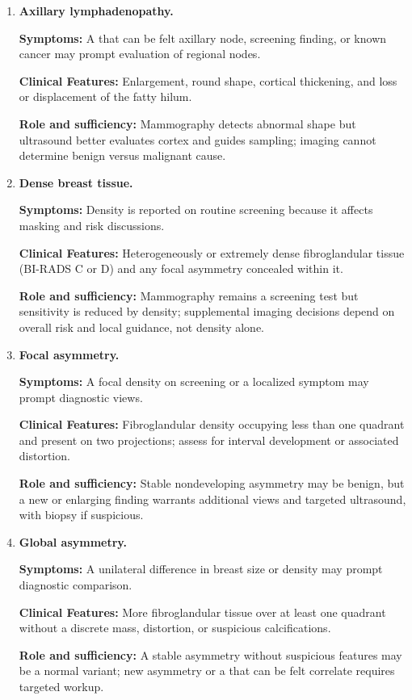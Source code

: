 \begin{enumerate}[leftmargin=*,itemsep=0.45em,topsep=0.4em]
\item \textbf{Axillary lymphadenopathy.}\par\noindent\textbf{Symptoms:} A that can be felt axillary node, screening finding, or known cancer may prompt evaluation of regional nodes.\par\noindent\textbf{Clinical Features:} Enlargement, round shape, cortical thickening, and loss or displacement of the fatty hilum.\par\noindent\textbf{Role and sufficiency:} Mammography detects abnormal shape but ultrasound better evaluates cortex and guides sampling; imaging cannot determine benign versus malignant cause.
\item \textbf{Dense breast tissue.}\par\noindent\textbf{Symptoms:} Density is reported on routine screening because it affects masking and risk discussions.\par\noindent\textbf{Clinical Features:} Heterogeneously or extremely dense fibroglandular tissue (BI-RADS C or D) and any focal asymmetry concealed within it.\par\noindent\textbf{Role and sufficiency:} Mammography remains a screening test but sensitivity is reduced by density; supplemental imaging decisions depend on overall risk and local guidance, not density alone.
\item \textbf{Focal asymmetry.}\par\noindent\textbf{Symptoms:} A focal density on screening or a localized symptom may prompt diagnostic views.\par\noindent\textbf{Clinical Features:} Fibroglandular density occupying less than one quadrant and present on two projections; assess for interval development or associated distortion.\par\noindent\textbf{Role and sufficiency:} Stable nondeveloping asymmetry may be benign, but a new or enlarging finding warrants additional views and targeted ultrasound, with biopsy if suspicious.
\item \textbf{Global asymmetry.}\par\noindent\textbf{Symptoms:} A unilateral difference in breast size or density may prompt diagnostic comparison.\par\noindent\textbf{Clinical Features:} More fibroglandular tissue over at least one quadrant without a discrete mass, distortion, or suspicious calcifications.\par\noindent\textbf{Role and sufficiency:} A stable asymmetry without suspicious features may be a normal variant; new asymmetry or a that can be felt correlate requires targeted workup.

\end{enumerate}
